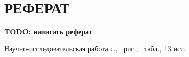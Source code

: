 \chapter*{РЕФЕРАТ}
\setcounter{page}{2}
\textbf{TODO: написать реферат}

Научно-исследовательская работа \pageref{LastPage} с., \totalfigures\ рис., \totaltables\ табл., 13 ист.

